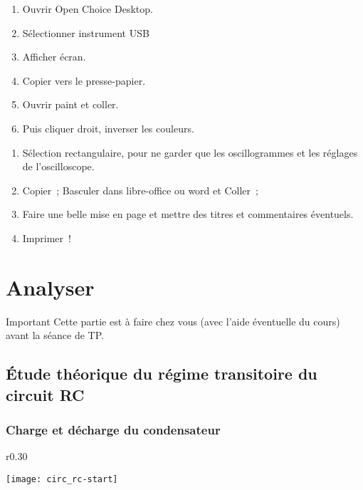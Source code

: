 \documentclass[a4paper, 11pt, final, garamond]{book}
\begin{document}
\begin{minipage}{0.49\linewidth}
    \begin{enumerate}
        \item Ouvrir Open Choice Desktop.
        \item Sélectionner instrument USB
        \item Afficher écran.
        \item Copier vers le presse-papier.
        \item Ouvrir paint et coller.
        \item Puis cliquer droit, inverser les couleurs.
    \end{enumerate}
\end{minipage}
\begin{minipage}{0.49\linewidth}
    \begin{enumerate}[start=6]
        \item Sélection rectangulaire, pour ne garder que les oscillogrammes et les
            réglages de l'oscilloscope.
        \item Copier~; Basculer dans libre-office ou word et Coller~;
        \item Faire une belle mise en page et mettre des titres et commentaires
            éventuels.
        \item Imprimer~!
    \end{enumerate}
\end{minipage}


\section{Analyser}

\begin{NCror}[width=\linewidth, halign=center]{Important}
    Cette partie est à faire chez vous (avec l'aide éventuelle du cours) avant
    la séance de TP.
\end{NCror}

\subsection{Étude théorique du régime transitoire du circuit RC}

\subsubsection{Charge et décharge du condensateur}

\begin{wrapfigure}[5]{r}{0.30\linewidth}
    \begin{center}
        \texttt{[image: circ\_rc-start]}
    \end{center}
\end{wrapfigure}
\end{document}
